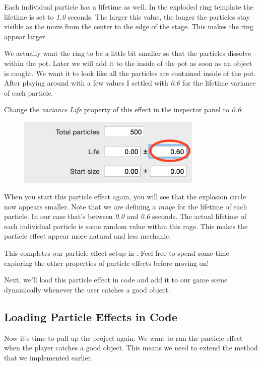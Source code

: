 Each individual particle has a lifetime as well. In the exploded ring template
the lifetime is set to \textit{1.0} seconds. The larger this value, the longer
the particles stay visible as the move from the center to the edge of the stage.
This makes the ring appear larger. 

We actually want the ring to be a little bit smaller so that the particles
dissolve within the pot. Later we will add it to the inside of the pot as soon
as an object is caught. We want it to look like all the particles are contained inside of the pot. After playing around with a
few values I settled with \textit{0.6} for the lifetime variance of each
particle.

\begin{leftbar}
Change the \textit{variance} \textit{Life} property of this effect in the
inspector panel to \textit{0.6}:
\begin{figure}[H]
  \centering
  \includegraphics[width=250pt]{images/Chapter9/change_lifetime.png}
\end{figure}
\end{leftbar}

When you start this particle effect again, you will see that the explosion
circle now appears smaller. Note that we are defining a \textit{range} for the lifetime
of each particle. In our case that's between \textit{0.0} and \textit{0.6}
seconds. The actual lifetime of each individual particle is some random value
within this rage. This makes the particle effect appear more natural and less
mechanic.

This completes our particle effect setup in \SB{}. Feel
free to spend some time exploring the other properties of particle effects
before moving on!

Next, we'll load this particle effect in code and add it to our game scene
dynamically whenever the user catches a good object.

\subsection{Loading Particle Effects in Code}
Now it's time to pull up the \xcode{} project again. We want to run the particle
effect when the player catches a good object. This means we need to extend the
 method that we implemented earlier.

